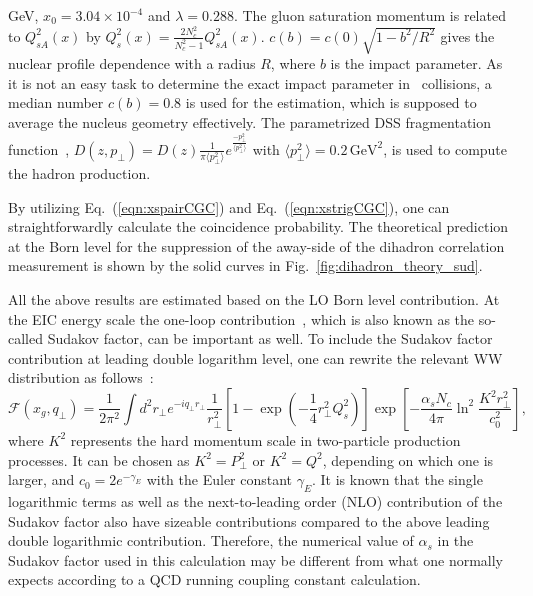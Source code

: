 GeV, $x_{0}=3.04\times 10^{-4}$ and  $\lambda=0.288$. The gluon saturation
momentum is related to $Q^{2}_{sA}(x)$ by
$Q_s^2(x)=\frac{2N_c^2}{N_c^2-1}Q^{2}_{sA}(x)$. $c(b)=c(0)\sqrt{1-b^{2}/R^{2}}$
gives the nuclear profile dependence with a radius $R$, where $b$ is the impact
parameter. As it is not an easy task to determine the exact impact parameter in \eA\
collisions, a median number $c(b)=0.8$ is used for the estimation,
which is supposed to average the nucleus geometry effectively. The parametrized
DSS fragmentation function~\cite{deFlorian:2007aj},
$D(z,p_{\perp})=D(z)\frac{1}{\pi\langle
p^{2}_{\perp}\rangle}e^{\frac{-p_{\perp}^{2}}{\langle p^{2}_{\perp}\rangle}}$ with
$\langle p^{2}_{\perp}\rangle=0.2 \, \mathrm{GeV}^{2}$, is used to compute the hadron
production.

By utilizing Eq.~(\ref{eqn:xspairCGC}) and Eq.~(\ref{eqn:xstrigCGC}), one can
straightforwardly calculate the coincidence probability. The theoretical
prediction at the Born level for the suppression of the away-side of the
dihadron correlation measurement is shown by the solid curves in
Fig.~\ref{fig:dihadron_theory_sud}.

All the above results are estimated based on the LO Born level
contribution. At the EIC energy scale the one-loop
contribution~\cite{Mueller:2012uf}, which is also known as the so-called Sudakov
factor, can be important as well. To include the Sudakov factor contribution at
leading double logarithm level, one can rewrite the relevant WW distribution as
follows~\cite{Mueller:2013wwa}:
\begin{equation}
\mathcal{F}(x_{g}, q_{\perp}) =
\frac{1}{2\pi^{2}} \int d^{2}r_{\perp} e^{-iq_{\perp}r_{\perp}}
\frac{1}{r^{2}_{\perp}}[1-\exp(-\frac{1}{4}r^{2}_{\perp}Q^{2}_{s})]
\exp[-\frac{\alpha_sN_c}{4\pi}\ln^2\frac{K^2r_{\perp}^2}{c^2_0}],
\label{eqn:Sudakov}
\end{equation}
where $K^2$ represents the hard momentum scale in two-particle production
processes. It can be chosen as $K^2=P^2_{\perp}$ or $K^2=Q^2$, depending on which
one is larger, and $c_0=2e^{-\gamma_E}$ with the Euler constant $\gamma_E$. It
is known that the single logarithmic terms as well as the next-to-leading order
(NLO) contribution of the Sudakov factor also have sizeable contributions 
compared to the above leading double logarithmic contribution. Therefore, the
numerical value of $\alpha_s$ in the Sudakov factor used in this calculation may
be different from what one normally expects according to a QCD running coupling
constant calculation.

